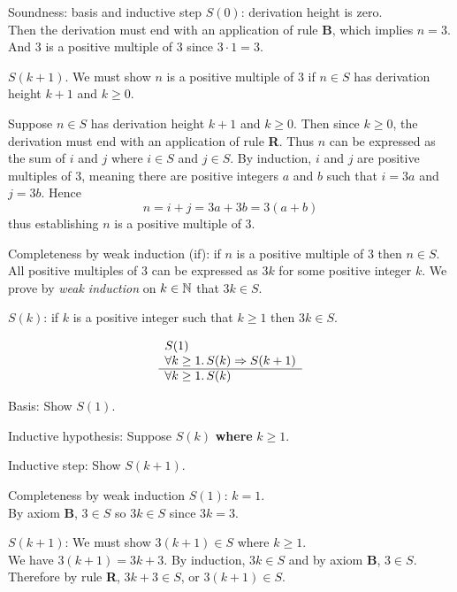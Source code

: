 \documentclass[style=sailor,size=12pt]{powerdot}
\begin{document}
\begin{wideslide}[bm=,toc=]{Soundness: basis and inductive step}
{\em $S(0)$\/}: derivation height is zero. \\ 
Then the derivation must end with an
application of rule {\bf B}, which implies $n=3$.
And 3 is a positive multiple of 3 since $3\cdot 1=3$.

\vspace{1em}
{\em $S(k + 1)$}.
We must show $n$ is a positive multiple of 3 if $n\in S$ has derivation height $k+1$ and $k\geq 0$.

\vspace{1em}
Suppose $n\in S$ has derivation height $k+1$ and $k\geq 0$.
Then since $k\geq 0$, the derivation must end with an application of rule {\bf R}.
Thus $n$ can be expressed as the sum of $i$ and $j$ where $i\in S$ and $j\in S$.
By induction, $i$ and $j$ are positive multiples of $3$, meaning there are positive integers
$a$ and $b$ such that $i=3a$ and $j=3b$.
Hence 
\[n = i + j = 3a + 3b = 3(a+b)
\]
thus establishing $n$ is a positive multiple of 3.
\end{wideslide}

\begin{wideslide}[bm=,toc=]{Completeness by weak induction}
(if): if $n$ is a positive multiple of 3 then $n\in S$.
All positive multiples of 3 can be expressed as $3k$ for some positive integer $k$.
We prove by {\em weak induction\/} on $k \in \mathbb{N}$ that $3k\in S$.


\vspace{1em}
$S(k)$: if $k$ is a positive integer such that $k\geq 1$ then $3k\in S$.

\begin{displaymath}
\begin{array}[t]{l}
S(1) \\
\forall k\geq 1.\, S(k)\Rightarrow S(k+1) \\
\hline
\forall k\geq 1.\, S(k)
\end{array}
\end{displaymath}

\vspace{1em}
Basis: Show $S(1)$.

\vspace{1em}
Inductive hypothesis: Suppose $S(k)$ {\bf where} $k\geq 1$.

\vspace{1em} 
Inductive step: Show $S(k+1)$.
\end{wideslide}

\begin{wideslide}[bm=,toc=]{Completeness by weak induction}
{\em $S(1)$\/}: $k=1$.\\  
\vspace{1em}
By axiom {\bf B}, $3\in S$ so $3k\in S$ since $3k = 3$.

\vspace{2em}
{\em $S(k + 1)$}:
We must show $3(k+1)\in S$ where $k\geq 1$.\\
\vspace{1em}
We have $3(k+1) = 3k + 3$.
By induction, $3k\in S$ and by axiom {\bf B}, $3\in S$.
Therefore by rule {\bf R}, $3k + 3\in S$, or $3(k+1)\in S$.
\end{wideslide}
\end{document}
